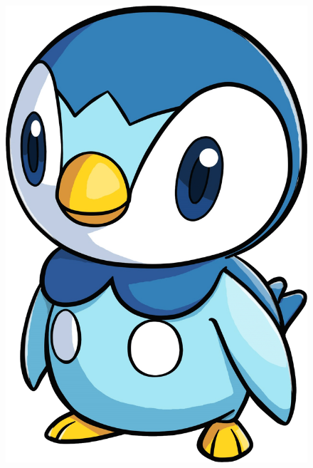 \documentclass[landscape,8pt]{article}
\begin{document}
{\begin{multicols}{3}
  \vspace*{\fill}
  \begin{figure}[H]
  \includegraphics[width=\linewidth]{revplup}
  \end{figure}

  \vspace*{\fill}
  \end{multicols}
}
\end{document}

